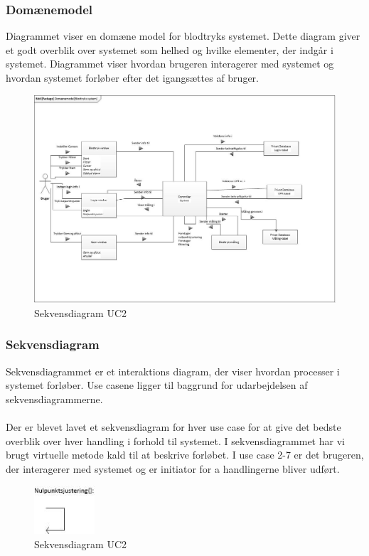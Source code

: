 \subsubsection{Domænemodel}
Diagrammet viser en domæne model for blodtryks systemet. Dette diagram giver et godt overblik over systemet som helhed og hvilke elementer, der indgår i systemet. Diagrammet viser hvordan brugeren interagerer med systemet og hvordan systemet forløber efter det igangsættes af bruger. 

\begin{figure}[H]
	\centering
	\includegraphics[width=1\textwidth]{Figurer/ISE/Domaenemodel}
	\caption{Sekvensdiagram UC2}
	\label{sd UC2}
\end{figure}

\subsubsection{Sekvensdiagram}
Sekvensdiagrammet er et interaktions diagram, der viser hvordan processer i systemet forløber. Use casene ligger til baggrund for udarbejdelsen af sekvensdiagrammerne.\\ \\
Der er blevet lavet et sekvensdiagram for hver use case for at give det bedste overblik over hver handling i forhold til systemet. I sekvensdiagrammet har vi brugt virtuelle metode kald til at beskrive forløbet. I use case 2-7 er det brugeren, der interagerer med systemet og er initiator for a handlingerne bliver udført.

\begin{figure}[H]
	\centering
	\includegraphics[width=0.2\textwidth]{Figurer/ISE/sdAppModelUC2}
	\caption{Sekvensdiagram UC2}
	\label{sd UC2}
\end{figure}

